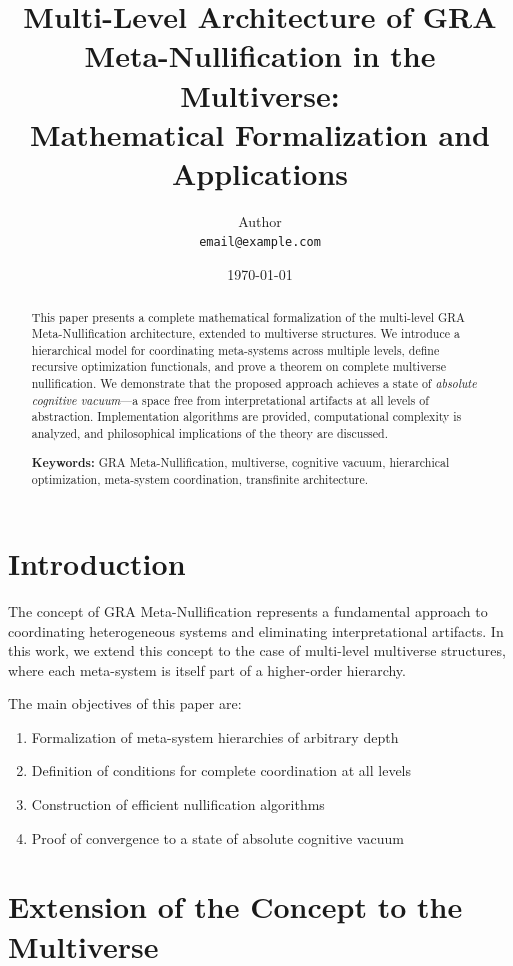 \documentclass[12pt,a4paper]{article}
\title{\textbf{Multi-Level Architecture of GRA Meta-Nullification in the Multiverse:\\
Mathematical Formalization and Applications}}
\author{
    Author\\
    \texttt{email@example.com}
}
\date{\today}
\begin{document}
\maketitle

\begin{abstract}
This paper presents a complete mathematical formalization of the multi-level GRA Meta-Nullification architecture, extended to multiverse structures. We introduce a hierarchical model for coordinating meta-systems across multiple levels, define recursive optimization functionals, and prove a theorem on complete multiverse nullification. We demonstrate that the proposed approach achieves a state of \textit{absolute cognitive vacuum}---a space free from interpretational artifacts at all levels of abstraction. Implementation algorithms are provided, computational complexity is analyzed, and philosophical implications of the theory are discussed.

\textbf{Keywords:} GRA Meta-Nullification, multiverse, cognitive vacuum, hierarchical optimization, meta-system coordination, transfinite architecture.
\end{abstract}

\tableofcontents
\newpage

\section{Introduction}

The concept of GRA Meta-Nullification represents a fundamental approach to coordinating heterogeneous systems and eliminating interpretational artifacts. In this work, we extend this concept to the case of multi-level multiverse structures, where each meta-system is itself part of a higher-order hierarchy.

The main objectives of this paper are:
\begin{enumerate}[label=\arabic*)]
    \item Formalization of meta-system hierarchies of arbitrary depth
    \item Definition of conditions for complete coordination at all levels
    \item Construction of efficient nullification algorithms
    \item Proof of convergence to a state of absolute cognitive vacuum
\end{enumerate}

\section{Extension of the Concept to the Multiverse}
\end{document}
